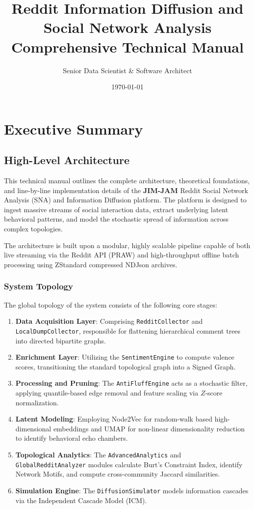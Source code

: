 \documentclass[12pt,a4paper]{report}
\title{\Huge \textbf{Reddit Information Diffusion and Social Network Analysis}\\ \vspace{0.5cm} \Large Comprehensive Technical Manual}
\author{Senior Data Scientist \& Software Architect}
\date{\today}
\begin{document}
\maketitle
\tableofcontents
\newpage

\chapter{Executive Summary}
\section{High-Level Architecture}
This technical manual outlines the complete architecture, theoretical foundations, and line-by-line implementation details of the \textbf{JIM-JAM} Reddit Social Network Analysis (SNA) and Information Diffusion platform. The platform is designed to ingest massive streams of social interaction data, extract underlying latent behavioral patterns, and model the stochastic spread of information across complex topologies.

The architecture is built upon a modular, highly scalable pipeline capable of both live streaming via the Reddit API (PRAW) and high-throughput offline batch processing using ZStandard compressed NDJson archives. 

\subsection{System Topology}
The global topology of the system consists of the following core stages:
\begin{enumerate}
    \item \textbf{Data Acquisition Layer}: Comprising \texttt{RedditCollector} and \texttt{LocalDumpCollector}, responsible for flattening hierarchical comment trees into directed bipartite graphs.
    \item \textbf{Enrichment Layer}: Utilizing the \texttt{SentimentEngine} to compute valence scores, transitioning the standard topological graph into a Signed Graph.
    \item \textbf{Processing and Pruning}: The \texttt{AntiFluffEngine} acts as a stochastic filter, applying quantile-based edge removal and feature scaling via $Z$-score normalization.
    \item \textbf{Latent Modeling}: Employing Node2Vec for random-walk based high-dimensional embeddings and UMAP for non-linear dimensionality reduction to identify behavioral echo chambers.
    \item \textbf{Topological Analytics}: The \texttt{AdvancedAnalytics} and \texttt{GlobalRedditAnalyzer} modules calculate Burt's Constraint Index, identify Network Motifs, and compute cross-community Jaccard similarities.
    \item \textbf{Simulation Engine}: The \texttt{DiffusionSimulator} models information cascades via the Independent Cascade Model (ICM).
\end{enumerate}
\end{document}

